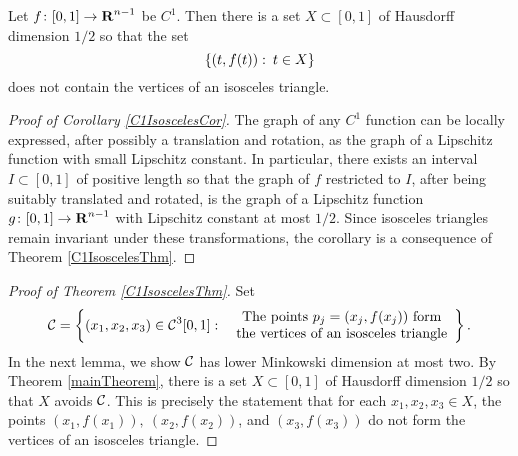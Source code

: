 \begin{corollary} \label{C1IsoscelesCor}
	Let $f\colon [0,1] \to \operatorname{\mathbf{R}}^{n-1}$ be $C^1$.  Then there is a set $X \subset [0,1]$ of Hausdorff dimension $1/2$ so that the set
	\[ \{(t,f(t)) \operatorname{\colon} t\in X\} \]
	does not contain the vertices of an isosceles triangle.
\end{corollary} 
\begin{proof}[Proof of Corollary \ref{C1IsoscelesCor}]
	The graph of any $C^1$ function can be locally expressed, after possibly a translation and rotation, as the graph of a Lipschitz function with small Lipschitz constant. In particular, there exists an interval $I\subset[0,1]$ of positive length so that the graph of $f$ restricted to $I$, after being suitably translated and rotated, is the graph of a Lipschitz function $g\colon [0,1] \to \operatorname{\mathbf{R}}^{n-1}$ with Lipschitz constant at most $1/2$. Since isosceles triangles remain invariant under these transformations, the corollary is a consequence of Theorem \ref{C1IsoscelesThm}.  
\end{proof} 

\begin{proof}[Proof of Theorem \ref{C1IsoscelesThm}]
	Set
	\begin{equation} \label{def-Z}
		\operatorname{\mathcal{C}} = \left\{ (x_1,x_2,x_3) \in \operatorname{\mathcal{C}}^3[0,1] \operatorname{\colon} \; \begin{array}{c}
			\text{The points $p_j = (x_j,f(x_j))$ form}\\
			\text{the vertices of an isosceles triangle}
		\end{array} \right\}.
	\end{equation} 
	In the next lemma, we show $\operatorname{\mathcal{C}}$ has lower Minkowski dimension at most two. By Theorem \ref{mainTheorem}, there is a set $X \subset [0,1]$ of Hausdorff dimension $1/2$ so that $X$ avoids $\operatorname{\mathcal{C}}$. This is precisely the statement that for each $x_1,x_2,x_3\in X$, the points $(x_1,f(x_1)),\ (x_2,f(x_2))$, and $(x_3,f(x_3))$ do not form the vertices of an isosceles triangle. 
\end{proof}

